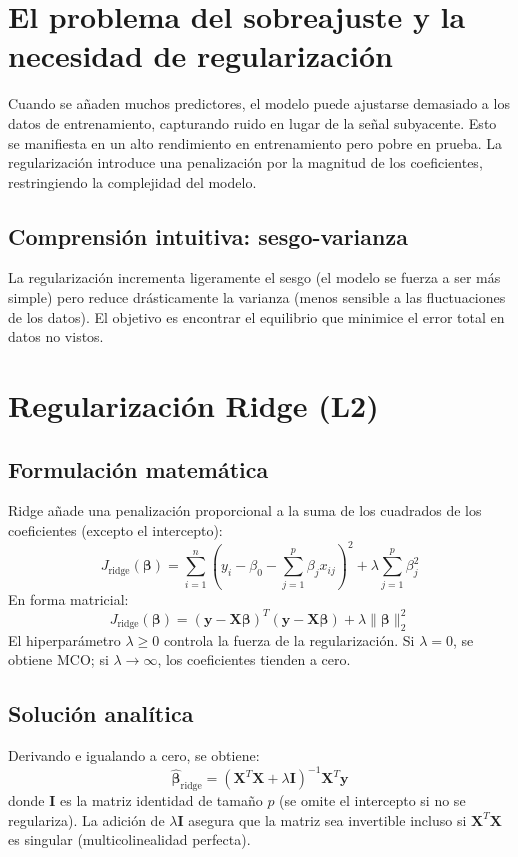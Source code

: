 \documentclass[12pt,a4paper,openany,oneside]{book}
\begin{document}
\section{El problema del sobreajuste y la necesidad de regularización}
Cuando se añaden muchos predictores, el modelo puede ajustarse demasiado a los datos de entrenamiento, capturando ruido en lugar de la señal subyacente. Esto se manifiesta en un alto rendimiento en entrenamiento pero pobre en prueba. La regularización introduce una penalización por la magnitud de los coeficientes, restringiendo la complejidad del modelo.

\subsection{Comprensión intuitiva: sesgo-varianza}
La regularización incrementa ligeramente el sesgo (el modelo se fuerza a ser más simple) pero reduce drásticamente la varianza (menos sensible a las fluctuaciones de los datos). El objetivo es encontrar el equilibrio que minimice el error total en datos no vistos.

\section{Regularización Ridge (L2)}
\subsection{Formulación matemática}
Ridge añade una penalización proporcional a la suma de los cuadrados de los coeficientes (excepto el intercepto):
\[
J_{\text{ridge}}(\boldsymbol{\beta}) = \sum_{i=1}^n (y_i - \beta_0 - \sum_{j=1}^p \beta_j x_{ij})^2 + \lambda \sum_{j=1}^p \beta_j^2
\]
En forma matricial:
\[
J_{\text{ridge}}(\boldsymbol{\beta}) = (\mathbf{y} - \mathbf{X}\boldsymbol{\beta})^T (\mathbf{y} - \mathbf{X}\boldsymbol{\beta}) + \lambda \|\boldsymbol{\beta}\|_2^2
\]
El hiperparámetro \(\lambda \geq 0\) controla la fuerza de la regularización. Si \(\lambda = 0\), se obtiene MCO; si \(\lambda \to \infty\), los coeficientes tienden a cero.

\subsection{Solución analítica}
Derivando e igualando a cero, se obtiene:
\[
\hat{\boldsymbol{\beta}}_{\text{ridge}} = (\mathbf{X}^T \mathbf{X} + \lambda \mathbf{I})^{-1} \mathbf{X}^T \mathbf{y}
\]
donde \(\mathbf{I}\) es la matriz identidad de tamaño \(p\) (se omite el intercepto si no se regulariza). La adición de \(\lambda \mathbf{I}\) asegura que la matriz sea invertible incluso si \(\mathbf{X}^T \mathbf{X}\) es singular (multicolinealidad perfecta).
\end{document}
